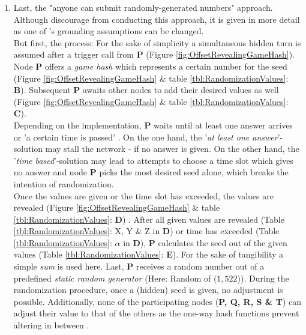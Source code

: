 \begin{enumerate}
	\item Last, the "anyone can submit randomly-generated numbers" \cite[403]{Chatterjee.2019} approach.
	Although \citet[406]{Chatterjee.2019} discourage from conducting this approach, it is given in more detail
	as one of \citet[406]{Chatterjee.2019}'s grounding assumptions can be changed. \\
	But first, the process:
	For the sake of simplicity a simultaneous hidden turn is assumed after a trigger call from \textbf{P} (Figure \ref{fig:OffsetRevealingGameHash}).
	Node \textbf{P} offers a \textit{game hash} which represents
	a certain number for the seed (Figure \ref{fig:OffsetRevealingGameHash} \& table \ref{tbl:RandomizationValues}: \textbf{B}).
	Subsequent \textbf{P} awaits other nodes to add their desired values as well (Figure \ref{fig:OffsetRevealingGameHash} \& table \ref{tbl:RandomizationValues}: \textbf{C}). \\
	Depending on the implementation, \textbf{P} waits until at least one answer arrives or 'a certain time is passed' \cite[406
	]{Chatterjee.2019}.
	On the one hand, the '\textit{at least one answer}'-solution may stall the network - if no answer is given.
	On the other hand, the '\textit{time based}'-solution may lead to attempts to choose a time slot
	which gives no answer and node \textbf{P} picks the most desired seed alone,
	which breaks the intention of randomization. \\
	Once the values are given or the time slot has exceeded, the values are revealed
	(Figure \ref{fig:OffsetRevealingGameHash} \& table \ref{tbl:RandomizationValues}: \textbf{D}) \cite[406]{Chatterjee.2019}.
	After all given values are revealed (Table \ref{tbl:RandomizationValues}: X, Y \& Z in \textbf{D}) or time has exceeded
	(Table \ref{tbl:RandomizationValues}: $\alpha$ in \textbf{D}), \textbf{P} calculates the seed
	out of the given values (Table \ref{tbl:RandomizationValues}: \textbf{E}).
	For the sake of tangibility a simple \textit{sum} is used here.
	Last, \textbf{P} receives a random number out of a predefined \textit{static random generator} (Here: Random of ($1,522$)).
	During the randomization procedure, once a (hidden) seed is given, no adjustment is possible.
	Additionally, none of the participating nodes (\textbf{P, Q, R, S \& T}) can adjust their value to that
	of the others as the one-way hash functions prevent altering in between \cite[406]{Chatterjee.2019}.
	\begin{table}[!b]
		\centering
		\begin{tabularx}{0.83\textwidth}{ c | c | c | c | c }

\end{tabularx}
\end{table}
\end{enumerate}
